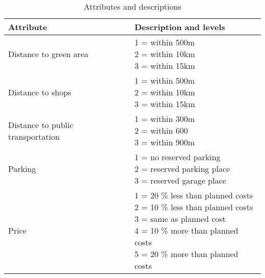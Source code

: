 \begin{table}[H]

\caption{Attributes and descriptions \label{tab:atts}}
\centering
\begin{tabular}[top]{>{\raggedright\arraybackslash}p{15em}l}
\toprule
Attribute & Description and levels\\
\midrule
Distance to green area & \makecell[l]{1 = within 500m \\ 2 = within 10km \\ 3 = within 15km}\\
\addlinespace
Distance to shops & \makecell[l]{1 = within 500m \\ 2 = within 10km \\ 3 = within 15km}\\
\addlinespace
Distance to public transportation & \makecell[l]{1 = within 300m \\ 2 = within 600 \\ 3 = within 900m}\\
\addlinespace
Parking & \makecell[l]{1 = no reserved parking \\ 2 = reserved parking place \\ 3 = reserved garage place}\\
\addlinespace
Price & \makecell[l]{1 = 20 \% less than planned costs \\ 2 = 10 \% less than planned costs \\ 3 = same as planned cost \\ 4 = 10 \% more than planned costs  \\ 5 = 20 \% more than planned costs}\\
\bottomrule
\end{tabular}
\end{table}
